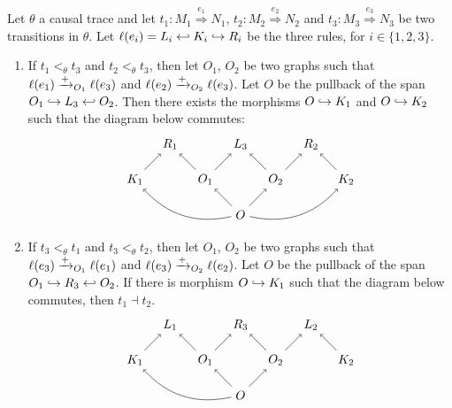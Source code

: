 \begin{lemma}
  Let $\theta$ a causal trace and let $t_1:M_1\overset{e_1}{\Rightarrow}N_1$, $t_2:M_2\overset{e_2}{\Rightarrow}N_2$ and $t_3:M_3\overset{e_3}{\Rightarrow}N_3$ be two transitions in $\theta$. Let $\ell(e_i) = L_i\hookleftarrow K_i \hookrightarrow R_i$ be the three rules, for $i\in\{1,2,3\}$.
  \begin{enumerate}
  \item
    \label{lem:constraint_meet}
    If $t_1<_{\theta} t_3$ and $t_2<_{\theta} t_3$, then let $O_1$, $O_2$ be two graphs such that $\ell(e_1)\xrightarrow{+}_{O_1}\ell(e_3)$ and $\ell(e_2)\xrightarrow{+}_{O_2}\ell(e_3)$. Let $O$ be the pullback of the span $O_1\hookrightarrow L_3 \hookleftarrow O_2$. Then there exists the morphisms $O\hookrightarrow K_1$ and $O\hookrightarrow K_2$ such that the diagram below commutes:
    \[
    \begin{tikzpicture} %
      \node (o) at (0,-1) {\(O\)};
      \node (r3) at (0,1) {\(L_3\)};
      \node (o1) at (-1,0) {\(O_1\)};
      \node (o2) at (1,0) {\(O_2\)};
      \node (r1) at (-2,1) {\(R_1\)};
      \node (r2) at (2,1) {\(R_2\)};
      \node (k1) at (-3,0) {\(K_1\)};
      \node (k2) at (3,0) {\(K_2\)};
      \draw [->] (o) -- (o1);
      \draw [->] (o) -- (o2);
      \draw [->] (o1) -- (r3);
      \draw [->] (o2) -- (r3);
      \draw [->] (o1) -- (r1);
      \draw [->] (o2) -- (r2);
      \draw [->] (k1) -- (r1);
      \draw [->] (k2) -- (r2);
      \draw [->] (o) to [bend left] (k1);
      \draw [->] (o) to [bend right] (k2);
    \end{tikzpicture}
    \]
  \item
    \label{lem:constraint_join}
    If $t_3 <_{\theta} t_1$ and $t_3<_{\theta} t_2$, then let $O_1$, $O_2$ be two graphs such that $\ell(e_3)\xrightarrow{+}_{O_1}\ell(e_1)$ and $\ell(e_3)\xrightarrow{+}_{O_2}\ell(e_2)$. Let $O$ be the pullback of the span $O_1\hookrightarrow R_3 \hookleftarrow O_2$. If there is morphism $O\hookrightarrow K_1$ such that the diagram below commutes, then $t_1\dashv t_2$.
    \[
    \begin{tikzpicture} %
      \node (o) at (0,-1) {\(O\)};
      \node (r3) at (0,1) {\(R_3\)};
      \node (o1) at (-1,0) {\(O_1\)};
      \node (o2) at (1,0) {\(O_2\)};
      \node (r1) at (-2,1) {\(L_1\)};
      \node (r2) at (2,1) {\(L_2\)};
      \node (k1) at (-3,0) {\(K_1\)};
      \node (k2) at (3,0) {\(K_2\)};
      \draw [->] (o) -- (o1);
      \draw [->] (o) -- (o2);
      \draw [->] (o1) -- (r3);
      \draw [->] (o2) -- (r3);
      \draw [->] (o1) -- (r1);
      \draw [->] (o2) -- (r2);
      \draw [->] (k1) -- (r1);
      \draw [->] (k2) -- (r2);
      \draw [->] (o) to [bend left] (k1);
    \end{tikzpicture}
    \]
  \end{enumerate}
\end{lemma}
